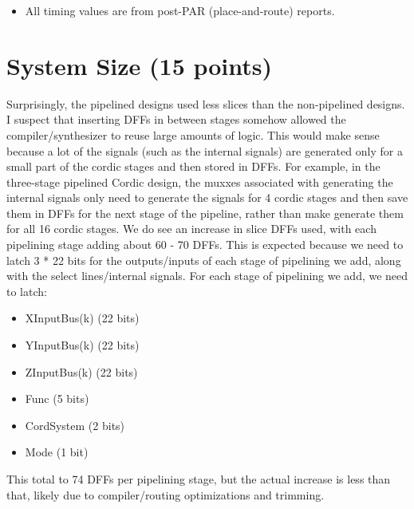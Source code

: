 \documentclass[
  10pt,
]{article}
\providecommand{\tightlist}{%
  \setlength{\itemsep}{0pt}\setlength{\parskip}{0pt}}
\begin{document}
\begin{itemize}
\tightlist
\item
  All timing values are from post-PAR (place-and-route) reports.
\end{itemize}

\section{System Size (15 points)}\label{system-size-15-points}

Surprisingly, the pipelined designs used less slices than the
non-pipelined designs. I suspect that inserting DFFs in between stages
somehow allowed the compiler/synthesizer to reuse large amounts of
logic. This would make sense because a lot of the signals (such as the
internal signals) are generated only for a small part of the cordic
stages and then stored in DFFs. For example, in the three-stage
pipelined Cordic design, the muxxes associated with generating the
internal signals only need to generate the signals for 4 cordic stages
and then save them in DFFs for the next stage of the pipeline, rather
than make generate them for all 16 cordic stages. We do see an increase
in slice DFFs used, with each pipelining stage adding about 60 - 70
DFFs. This is expected because we need to latch 3 * 22 bits for the
outputs/inputs of each stage of pipelining we add, along with the select
lines/internal signals. For each stage of pipelining we add, we need to
latch:

\begin{itemize}
\tightlist
\item
  XInputBus(k) (22 bits)
\item
  YInputBus(k) (22 bits)
\item
  ZInputBus(k) (22 bits)
\item
  Func (5 bits)
\item
  CordSystem (2 bits)
\item
  Mode (1 bit)
\end{itemize}

This total to 74 DFFs per pipelining stage, but the actual increase is
less than that, likely due to compiler/routing optimizations and
trimming.
\end{document}
